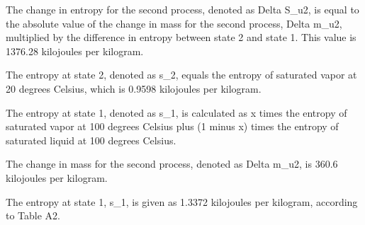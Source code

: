 The change in entropy for the second process, denoted as Delta S_u2, is equal to the absolute value of the change in mass for the second process, Delta m_u2, multiplied by the difference in entropy between state 2 and state 1. This value is 1376.28 kilojoules per kilogram.

The entropy at state 2, denoted as s_2, equals the entropy of saturated vapor at 20 degrees Celsius, which is 0.9598 kilojoules per kilogram.

The entropy at state 1, denoted as s_1, is calculated as x times the entropy of saturated vapor at 100 degrees Celsius plus (1 minus x) times the entropy of saturated liquid at 100 degrees Celsius.

The change in mass for the second process, denoted as Delta m_u2, is 360.6 kilojoules per kilogram.

The entropy at state 1, s_1, is given as 1.3372 kilojoules per kilogram, according to Table A2.